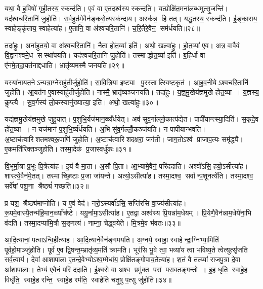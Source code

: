 यथा॒ वै ह॒विषो॑ गृही॒तस्य॒ स्कन्द॑ति। ए॒वं वा ए॒तदश्व॑स्य स्कन्दति। यत्प्रोक्षि॑त॒मना॑लब्धमुत्सृ॒जन्ति॑। यद॑श्वचरि॒तानि॑ जु॒होति॑। स॒र्व॒हुत॑मे॒वैन॑ङ्करो॒त्यस्क॑न्दाय। अस्क॑न्न॒ हि तत्। यद्धु॒तस्य॒ स्कन्द॑ति। ई॒ङ्का॒राय॒ स्वाहेङ्कृ॑ताय॒ स्वाहेत्या॑ह। ए॒तानि॒ वा अ॑श्वचरि॒तानि॑। च॒रि॒तैरे॒वैन॒ सम॑र्धयति॥२८॥

तदा॑हुः। अना॑हुतयो॒ वा अ॑श्वचरि॒तानि॑। नैता हो॑त॒व्या॑ इति॑। अथो॒ खल्वा॑हुः। हो॒त॒व्या॑ ए॒व। अत्र॒ वावैवं वि॒द्वान॑श्वमे॒ध सस्था॑पयति। यद॑श्वचरि॒तानि॑ जु॒होति॑। तस्माद्धोत॒व्या॑ इति॑। ब॒हि॒र्धा वा ए॑नमे॒तदा॒यत॑नाद्दधाति। भ्रातृ॑व्यमस्मै जनयति॥२९॥

यस्या॑नायत॒नेऽन्यत्रा॒ग्नेराहु॑तीर्जु॒होति॑। सा॒वि॒त्रि॒या इष्ट्या पु॒रस्तात्स्विष्ट॒कृत॑। आ॒ह॒व॒नीयेऽश्वचरि॒तानि॑ जुहोति। आ॒यत॑न ए॒वास्याहु॑तीर्जुहोति। नास्मै॒ भ्रातृ॑व्यञ्जनयति। तदा॑हुः। य॒ज्ञ॒मु॒खेय॑ज्ञमुखे होत॒व्या। य॒ज्ञस्य॒ कॢप्त्यै। सु॒व॒र्गस्य॑ लो॒कस्यानु॑ख्यात्या॒ इति॑। अथो॒ खल्वा॑हुः॥३०॥

यद्य॑ज्ञमु॒खेय॑ज्ञमुखे जुहु॒यात्। प॒शुभि॒र्यज॑मान॒व्व्यँ॑र्धयेत्। अव॑ सुव॒र्गाल्लो॒कात्प॑द्येत। पापी॑यान्त्स्या॒दिति॑। स॒कृदे॒व हो॑त॒व्या। न यज॑मानं प॒शुभि॒र्व्य॑र्धयति। अ॒भि सु॑व॒र्गल्लोँ॒कञ्ज॑यति। न पापी॑यान्भवति। अ॒ष्टाच॑त्वारिशतमश्वरू॒पाणि॑ जुहोति। अ॒ष्टाच॑त्वारिशदक्षरा॒ जग॑ती। जाग॒तोऽश्व॑ प्राजाप॒त्यः समृ॑द्ध्यै। ए॒कमति॑रिक्तञ्जुहोति। तस्मा॒देक॑ प्र॒जास्वर्धु॑कः॥३१॥\anuvakamend[अ॒र्ध॒य॒ति॒ ज॒न॒य॒ति॒ खल्वा॑हु॒र्जग॑ती॒ त्रीणि॑ च]

वि॒भूर्मा॒त्रा प्र॒भूः पि॒त्रेत्या॑ह। इ॒यं वै मा॒ता। अ॒सौ पि॒ता। आ॒भ्यामे॒वैनं॒ परि॑ददाति। अश्वो॑ऽसि॒ हयो॒ऽसीत्या॑ह। शास्त्ये॒वैन॑मे॒तत्। तस्माच्छि॒ष्टाः प्र॒जा जा॑यन्ते। अत्यो॒ऽसीत्या॑ह। तस्मा॒दश्व॒ सर्वान्प॒शूनत्ये॑ति। तस्मा॒दश्व॒ सर्वे॑षां पशू॒ना श्रैष्ठ्यं॑ गच्छति॥३२॥

प्र यश॒ श्रैष्ठ्य॑माप्नोति। य ए॒वं वेद॑। नरो॒ऽस्यर्वा॑ऽसि॒ सप्ति॑रसि वा॒ज्य॑सीत्या॑ह। रू॒पमे॒वास्यै॒तन्म॑हि॒मान॒व्व्याँच॑ष्टे। ययु॒र्नामा॒ऽसीत्या॑ह। ए॒तद्वा अश्व॑स्य प्रि॒यन्ना॑म॒धेयम्। प्रि॒येणै॒वैन॑न्नाम॒धेये॑ना॒भि व॑दति। तस्मा॒दप्या॑मि॒त्रौ स॒ङ्गत्य॑। नाम्ना॒ चेद्ध्वये॑ते। मि॒त्रमे॒व भ॑वतः॥३३॥

आ॒दि॒त्यानां॒ पत्वाऽन्वि॒हीत्या॑ह। आ॒दि॒त्याने॒वैन॑ङ्गमयति। अ॒ग्नये॒ स्वाहा॒ स्वाहेन्द्रा॒ग्निभ्या॒मिति॑ पूर्वहो॒माञ्जु॑होति। पूर्व॑ ए॒व द्वि॒षन्त॒म्भ्रातृ॑व्य॒मति॑ क्रामति। भूर॑सि भु॒वे त्वा॒ भव्या॑य त्वा भविष्य॒ते त्वेत्युत्सृ॑जति सर्व॒त्वाय॑। देवा॑ आशापाला ए॒तन्दे॒वेभ्योऽश्व॒म्मेधा॑य॒ प्रोक्षि॑तङ्गोपाय॒तेत्या॑ह। श॒तं वै तल्प्या॑ राजपु॒त्रा दे॒वा आ॑शापा॒लाः। तेभ्य॑ ए॒वैनं॒ परि॑ ददाति। ई॒श्व॒रो वा अश्व॒ प्रमु॑क्त॒ परां परा॒वत॒ङ्गन्तो। इ॒ह धृति॒ स्वाहे॒ह विधृ॑ति॒ स्वाहे॒ह रन्ति॒ स्वाहे॒ह रम॑ति॒ स्वाहेति॑ चतृ॒षु प॒त्सु जु॑होति॥३४॥

